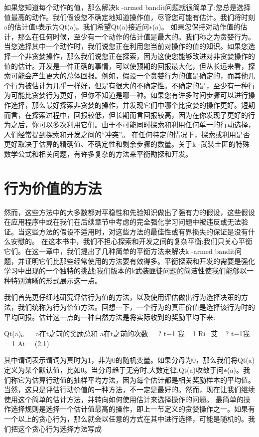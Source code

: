 如果您知道每个动作的值，那么解决k -armed bandit问题就很简单了:您总是选择值最高的动作。我们假设您不确定地知道操作值，尽管您可能有估计。我们将时刻a的估计值t表示为Qt(a)。我们希望Qt(a)接近问∗(a)。
如果您保持对动作值的估计，那么在任何时候，至少有一个动作的估计值是最大的。我们称之为贪婪行为。当您选择其中一个动作时，我们说您正在利用您当前对操作的值的知识。如果您选择一个非贪婪操作，那么我们说您正在探索，因为这使您能够改进对非贪婪操作的值的估计。开发是一件正确的事情，可以使预期的回报最大化，但从长远来看，探索可能会产生更大的总体回报。例如，假设一个贪婪行为的值是确定的，而其他几个行为被估计为几乎一样好，但是有很大的不确定性。不确定的是，至少有一种行为可能比贪婪行为更好，但你不知道是哪一种。如果您有许多时间步骤可以进行操作选择，那么最好探索非贪婪的操作，并发现它们中哪个比贪婪的操作更好。短期而言，在探索过程中，回报较低，但长期而言回报较高，因为在你发现了更好的行为之后，你可以多次利用它们。由于不可能同时探索和利用任何单一的行动选择，人们经常提到探索和开发之间的“冲突”。
在任何特定的情况下，探索或利用是否更好取决于估算的精确值、不确定性和剩余步骤的数量。关于k -武装土匪的特殊数学公式和相关问题，有许多复杂的方法来平衡勘探和开发。

\section{行为价值的方法}
然而，这些方法中的大多数都对平稳性和先验知识做出了强有力的假设，这些假设在应用程序中或在我们在后续章节中考虑的完全强化学习问题中被违反或无法验证。当这些方法的假设不适用时，对这些方法的最佳性或有界损失的保证是没有什么安慰的。
在这本书中，我们不担心探索和开发之间的复杂平衡;我们只关心平衡它们。在这一章中，我们提出了几种简单的平衡方法来解决k -armed bandit问题，并证明它们比那些经常使用的方法要有效得多。平衡探索和开发的需要是强化学习中出现的一个独特的挑战;我们版本的k武装匪徒问题的简洁性使我们能够以一种特别清晰的形式展示这一点。

我们首先更仔细地研究评估行为值的方法，以及使用评估做出行为选择决策的方法，我们统称为行为价值方法。回想一下，一个行为的真正价值是选择该行为时的平均回报。估计这一点的一种自然方法是将实际收到的奖励平均下来:

Qt(a)。= a在t之前的奖励总和
a在t之前的次数
=
? t−1
我= 1 Ri·艾= ? t−1我= 1 Ai =
(2.1)

其中谓词表示谓词为真时为1，非为0的随机变量。如果分母为0，那么我们将Qt(a)定义为某个默认值，比如0。当分母趋于无穷时,大数定律,Qt(a)收敛于问∗(a)。我们称它为估算行动值的抽样平均方法，因为每个估计都是相关奖励样本的平均值。当然，这只是评估行动价值的一种方法，不一定是最好的。然而，现在让我们继续使用这个简单的估计方法，并转向如何使用估计来选择操作的问题。
最简单的操作选择规则是选择一个估计值最高的操作，即上一节定义的贪婪操作之一。如果有一个以上的贪心行为，那么就会以任意的方式在其中进行选择，可能是随机的。我们把这个贪心行为选择方法写成

